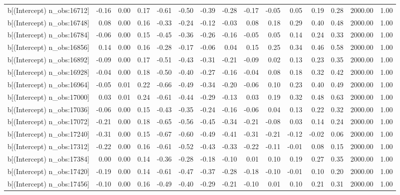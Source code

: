 \begin{table}[ht]
\begin{tabular}{rrrrrrrrrrrrrrr}
  b[(Intercept) n\_obs:16712] & -0.16 & 0.00 & 0.17 & -0.61 & -0.50 & -0.39 & -0.28 & -0.17 & -0.05 & 0.05 & 0.19 & 0.28 & 2000.00 & 1.00 \\ 
  b[(Intercept) n\_obs:16748] & 0.08 & 0.00 & 0.16 & -0.33 & -0.24 & -0.12 & -0.03 & 0.08 & 0.18 & 0.29 & 0.40 & 0.48 & 2000.00 & 1.00 \\ 
  b[(Intercept) n\_obs:16784] & -0.06 & 0.00 & 0.15 & -0.45 & -0.36 & -0.26 & -0.16 & -0.05 & 0.05 & 0.14 & 0.24 & 0.33 & 2000.00 & 1.00 \\ 
  b[(Intercept) n\_obs:16856] & 0.14 & 0.00 & 0.16 & -0.28 & -0.17 & -0.06 & 0.04 & 0.15 & 0.25 & 0.34 & 0.46 & 0.58 & 2000.00 & 1.00 \\ 
  b[(Intercept) n\_obs:16892] & -0.09 & 0.00 & 0.17 & -0.51 & -0.43 & -0.31 & -0.21 & -0.09 & 0.02 & 0.13 & 0.23 & 0.35 & 2000.00 & 1.00 \\ 
  b[(Intercept) n\_obs:16928] & -0.04 & 0.00 & 0.18 & -0.50 & -0.40 & -0.27 & -0.16 & -0.04 & 0.08 & 0.18 & 0.32 & 0.42 & 2000.00 & 1.00 \\ 
  b[(Intercept) n\_obs:16964] & -0.05 & 0.01 & 0.22 & -0.66 & -0.49 & -0.34 & -0.20 & -0.06 & 0.10 & 0.23 & 0.40 & 0.49 & 2000.00 & 1.00 \\ 
  b[(Intercept) n\_obs:17000] & 0.03 & 0.01 & 0.24 & -0.61 & -0.44 & -0.29 & -0.13 & 0.03 & 0.19 & 0.32 & 0.48 & 0.63 & 2000.00 & 1.00 \\ 
  b[(Intercept) n\_obs:17036] & -0.06 & 0.00 & 0.15 & -0.43 & -0.35 & -0.24 & -0.16 & -0.06 & 0.04 & 0.13 & 0.22 & 0.32 & 2000.00 & 1.00 \\ 
  b[(Intercept) n\_obs:17072] & -0.21 & 0.00 & 0.18 & -0.65 & -0.56 & -0.45 & -0.34 & -0.21 & -0.08 & 0.03 & 0.14 & 0.24 & 2000.00 & 1.00 \\ 
  b[(Intercept) n\_obs:17240] & -0.31 & 0.00 & 0.15 & -0.67 & -0.60 & -0.49 & -0.41 & -0.31 & -0.21 & -0.12 & -0.02 & 0.06 & 2000.00 & 1.00 \\ 
  b[(Intercept) n\_obs:17312] & -0.22 & 0.00 & 0.16 & -0.61 & -0.52 & -0.43 & -0.33 & -0.22 & -0.11 & -0.01 & 0.08 & 0.15 & 2000.00 & 1.00 \\ 
  b[(Intercept) n\_obs:17384] & 0.00 & 0.00 & 0.14 & -0.36 & -0.28 & -0.18 & -0.10 & 0.01 & 0.10 & 0.19 & 0.27 & 0.35 & 2000.00 & 1.00 \\ 
  b[(Intercept) n\_obs:17420] & -0.19 & 0.00 & 0.14 & -0.61 & -0.47 & -0.37 & -0.28 & -0.18 & -0.10 & -0.01 & 0.10 & 0.20 & 2000.00 & 1.00 \\ 
  b[(Intercept) n\_obs:17456] & -0.10 & 0.00 & 0.16 & -0.49 & -0.40 & -0.29 & -0.21 & -0.10 & 0.01 & 0.10 & 0.21 & 0.31 & 2000.00 & 1.00 \\ 

\end{tabular}
\end{table}

